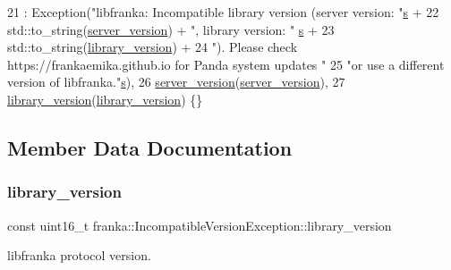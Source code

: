 \begin{DoxyCode}
21     : Exception(\textcolor{stringliteral}{"libfranka: Incompatible library version (server version: "}\hyperlink{namespaceservice__node__3_aa976421a49e0b54f23833423400849ae}{s} +
22                 std::to\_string(\hyperlink{structfranka_1_1IncompatibleVersionException_a0928098d8c32f405d17b65a0f004b5ab}{server\_version}) + \textcolor{stringliteral}{", library version: "}
      \hyperlink{namespaceservice__node__3_aa976421a49e0b54f23833423400849ae}{s} +
23                 std::to\_string(\hyperlink{structfranka_1_1IncompatibleVersionException_a81e6d7f01965ed7ee34f83dc3883ad01}{library\_version}) +
24                 \textcolor{stringliteral}{"). Please check https://frankaemika.github.io for Panda system updates "}
25                 \textcolor{stringliteral}{"or use a different version of libfranka."}\hyperlink{namespaceservice__node__3_aa976421a49e0b54f23833423400849ae}{s}),
26       \hyperlink{structfranka_1_1IncompatibleVersionException_a0928098d8c32f405d17b65a0f004b5ab}{server\_version}(\hyperlink{structfranka_1_1IncompatibleVersionException_a0928098d8c32f405d17b65a0f004b5ab}{server\_version}),
27       \hyperlink{structfranka_1_1IncompatibleVersionException_a81e6d7f01965ed7ee34f83dc3883ad01}{library\_version}(\hyperlink{structfranka_1_1IncompatibleVersionException_a81e6d7f01965ed7ee34f83dc3883ad01}{library\_version}) \{\}
\end{DoxyCode}


\subsection{Member Data Documentation}
\mbox{\label{structfranka_1_1IncompatibleVersionException_a81e6d7f01965ed7ee34f83dc3883ad01}} 
\subsubsection{\texorpdfstring{library\+\_\+version}{library\_version}}
{\footnotesize\ttfamily const uint16\+\_\+t franka\+::\+Incompatible\+Version\+Exception\+::library\+\_\+version}

libfranka protocol version. 

